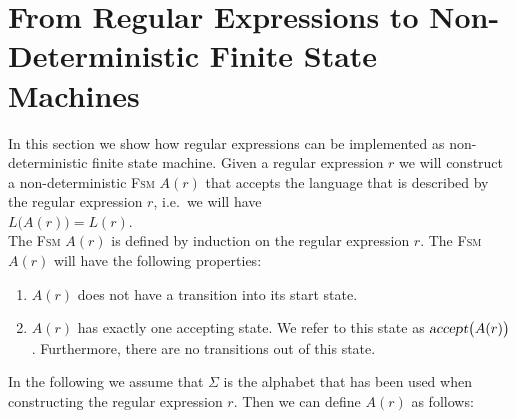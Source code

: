\section{From Regular Expressions to Non-Deterministic Finite State Machines}
In this section we show how regular expressions can be implemented as non-deterministic finite state machine.
Given a regular expression $r$ we will construct a non-deterministic \textsc{Fsm} $A(r)$ that accepts the
language that is described by the regular expression $r$, i.e.~we will have
\\[0.2cm]
\hspace*{1.3cm}
$L\bigl(A(r)\bigr) = L(r)$.
\\[0.2cm]
The \textsc{Fsm} $A(r)$ is defined by induction on the regular expression $r$.  The \textsc{Fsm} $A(r)$ will
have the following properties:
\begin{enumerate}
\item $A(r)$ does not have a transition into its start state.  
\item $A(r)$ has exactly one accepting state.  We refer to this state as
      $\textsl{accept}\bigl(A(r)\bigr)$.  Furthermore, there are no transitions out of this state.
\end{enumerate}
In the following we assume that $\Sigma$ is the alphabet that has been used when constructing the regular
expression $r$.  Then we can define $A(r)$ as follows:

